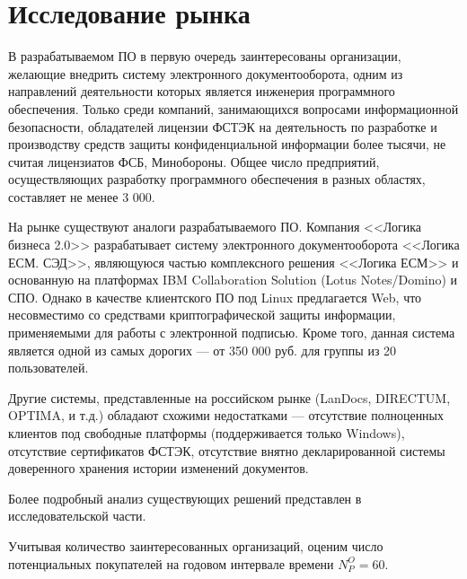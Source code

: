 \section{Исследование рынка} \label{economics_market_research}

В разрабатываемом ПО в первую очередь заинтересованы организации, желающие внедрить систему электронного документооборота, одним из направлений деятельности которых является инженерия программного обеспечения.
Только среди компаний, занимающихся вопросами информационной безопасности, обладателей лицензии ФСТЭК на деятельность по разработке и производству средств защиты конфиденциальной информации более тысячи, не считая лицензиатов ФСБ, Минобороны.
Общее число предприятий, осуществляющих разработку программного обеспечения в разных областях, составляет не менее 3 000.

\vspace{\baselineskip}
На рынке существуют аналоги разрабатываемого ПО. Компания <<Логика бизнеса 2.0>> разрабатывает систему электронного документооборота <<Логика ЕСМ. СЭД>>, являющуюся частью комплексного решения <<Логика ЕСМ>> и основанную на платформах IBM Collaboration Solution (Lotus Notes/Domino) и СПО. Однако в качестве клиентского ПО под Linux предлагается Web, что несовместимо со средствами криптографической защиты информации, применяемыми для работы с электронной подписью. Кроме того, данная система является одной из самых дорогих --- от 350 000 руб. для группы из 20 пользователей.

Другие системы, представленные на российском рынке (LanDocs, DIRECTUM, OPTIMA, и т.д.) обладают схожими недостатками --- отсутствие полноценных клиентов под свободные платформы (поддерживается только Windows), отсутствие сертификатов ФСТЭК, отсутствие внятно декларированной системы доверенного хранения истории изменений документов.

Более подробный анализ существующих решений представлен в исследовательской части.

\vspace{\baselineskip}
Учитывая количество заинтересованных организаций, оценим число потенциальных покупателей на годовом интервале времени $N_P^O = 60$.

